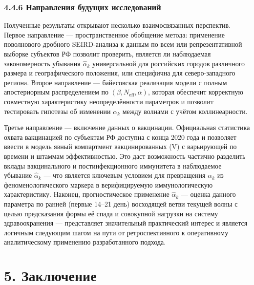 \documentclass[12pt]{article}
\begin{document}
\subsubsection{4.4.6 Направления будущих
исследований}\label{ux43dux430ux43fux440ux430ux432ux43bux435ux43dux438ux44f-ux431ux443ux434ux443ux449ux438ux445-ux438ux441ux441ux43bux435ux434ux43eux432ux430ux43dux438ux439}

Полученные результаты открывают несколько взаимосвязанных перспектив.
Первое направление --- пространственное обобщение метода: применение
поволнового дробного SEIRD-анализа к данным по всем или репрезентативной
выборке субъектов РФ позволит проверить, является ли наблюдаемая
закономерность убывания \(\hat{\alpha}_k\) универсальной для российских
городов различного размера и географического положения, или специфична
для северо-западного региона. Второе направление --- байесовская
реализация модели с полным апостериорным распределением по
\((\beta, N_{\text{eff}}, \alpha)\), которая обеспечит корректную
совместную характеристику неопределённости параметров и позволит
тестировать гипотезы об изменении \(\alpha_k\) между волнами с учётом
коллинеарности.

Третье направление --- включение данных о вакцинации. Официальная
статистика охвата вакцинацией по субъектам РФ доступна с конца 2020 года
и позволяет ввести в модель явный компартмент вакцинированных (V) с
варьирующей по времени и штаммам эффективностью. Это даст возможность
частично разделить вклады вакцинального и постинфекционного иммунитета в
наблюдаемое убывание \(\hat{\alpha}_k\) --- что является ключевым
условием для превращения \(\alpha_k\) из феноменологического маркера в
верифицируемую иммунологическую характеристику. Наконец, прогностическое
применение \(\hat{\alpha}_k\) --- оценка данного параметра по ранней
(первые 14--21 день) восходящей ветви текущей волны с целью предсказания
формы её спада и совокупной нагрузки на систему здравоохранения ---
представляет значительный практический интерес и является логичным
следующим шагом на пути от ретроспективного к оперативному
аналитическому применению разработанного подхода.

\section{5.
Заключение}\label{ux437ux430ux43aux43bux44eux447ux435ux43dux438ux435}
\end{document}
